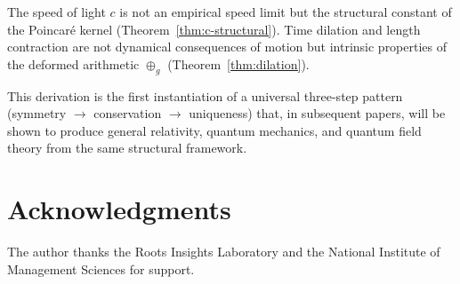 \documentclass[12pt]{article}
\theoremstyle{plain}
\theoremstyle{definition}
\theoremstyle{remark}
\begin{document}
The speed of light $c$ is not an empirical speed limit but the structural constant of the Poincar\'e kernel (Theorem~\ref{thm:c-structural}). Time dilation and length contraction are not dynamical consequences of motion but intrinsic properties of the deformed arithmetic $\oplus_g$ (Theorem~\ref{thm:dilation}).

This derivation is the first instantiation of a universal three-step pattern (symmetry $\to$ conservation $\to$ uniqueness) that, in subsequent papers, will be shown to produce general relativity, quantum mechanics, and quantum field theory from the same structural framework.


\section*{Acknowledgments}

The author thanks the Roots Insights Laboratory and the National Institute of Management Sciences for support.
\end{document}
